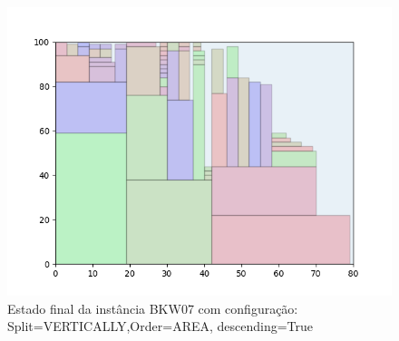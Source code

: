 \begin{figure}[H]
    \centering
    \caption[]{Estado final da instância BKW07 com configuração: Split=VERTICALLY,Order=AREA, descending=True}
    \label{fig:bkw07-vertically-area-true}
    \includegraphics[scale=0.5]{output/figures/bkw/bkw07/vertically/area/true/00}
\end{figure}